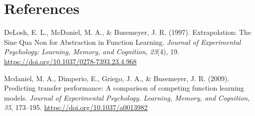 \documentclass[
  letterpaper,
  DIV=11,
  numbers=noendperiod]{scrartcl}
\newlength{\cslhangindent}
\newenvironment{CSLReferences}[2] %
 {\begin{list}{}{%
  \setlength{\itemindent}{0pt}
  \setlength{\leftmargin}{0pt}
  \setlength{\parsep}{0pt}
  \ifodd #1
   \setlength{\leftmargin}{\cslhangindent}
   \setlength{\itemindent}{-1\cslhangindent}
  \fi
  \setlength{\itemsep}{#2\baselineskip}}}
 {\end{list}}
\begin{document}
\section*{References}\label{references}

\label{refs}
\begin{CSLReferences}{1}{0}
DeLosh, E. L., McDaniel, M. A., \& Busemeyer, J. R. (1997).
Extrapolation: {The Sine Qua Non} for {Abstraction} in {Function
Learning}. \emph{Journal of Experimental Psychology: Learning, Memory,
and Cognition}, \emph{23}(4), 19.
\url{https://doi.org/10.1037/0278-7393.23.4.968}

Mcdaniel, M. A., Dimperio, E., Griego, J. A., \& Busemeyer, J. R.
(2009). Predicting transfer performance: {A} comparison of competing
function learning models. \emph{Journal of Experimental Psychology.
Learning, Memory, and Cognition}, \emph{35}, 173--195.
\url{https://doi.org/10.1037/a0013982}

\end{CSLReferences}
\end{document}

